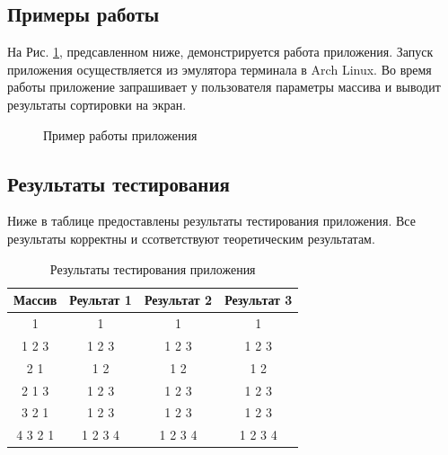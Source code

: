 \documentclass[a4paper,12pt]{article}
\begin{document}
\subsection{Примеры работы}
На Рис. \ref{images:example}, предсавленном ниже, демонстрируется работа приложения. Запуск приложения осуществляется из эмулятора терминала в Arch Linux. Во время работы приложение запрашивает у пользователя параметры массива и выводит результаты сортировки на экран.
\begin{figure}[h]
\caption{Пример работы приложения}
\label{images:example}
\end{figure}

\newpage
\subsection{Результаты тестирования}
Ниже в таблице предоставлены результаты тестирования приложения.
Все результаты корректны и ссответствуют теоретическим результатам.
\begin{table}[h]
\caption{\label{tablice:tests}Результаты тестирования приложения}
\begin{center}
\begin{tabular}{|c|c|c|c|}
\hline
Массив & Реультат 1 & Результат 2 & Результат 3 \\
\hline
1 & 1 & 1 & 1 \\
\hline
1 2 3 & 1 2 3 & 1 2 3 & 1 2 3 \\
\hline
2 1 & 1 2 & 1 2 & 1 2 \\
\hline
2 1 3 & 1 2 3 & 1 2 3 & 1 2 3 \\
\hline
3 2 1 & 1 2 3 & 1 2 3 & 1 2 3 \\
\hline
4 3 2 1 & 1 2 3 4 & 1 2 3 4 & 1 2 3 4 \\
\hline
\end{tabular}
\end{center}
\end{table}

\newpage
\end{document}
